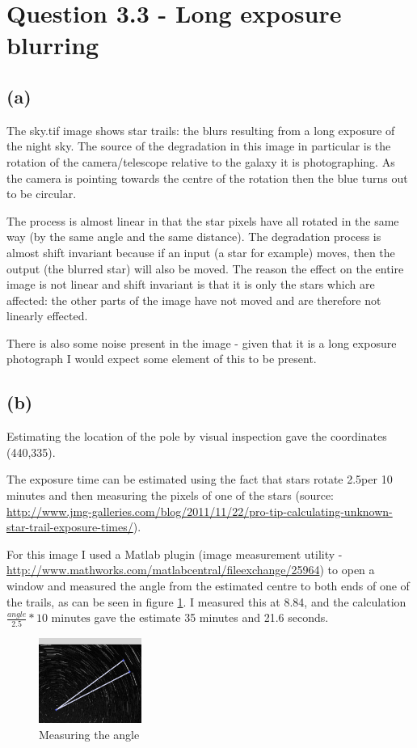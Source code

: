 \documentclass{article}
\begin{document}
\section*{Question 3.3 - Long exposure blurring}
\subsection*{(a)}
The sky.tif image shows star trails: the blurs resulting from a long exposure of the night sky. The source of the degradation in this image in particular is the rotation of the camera/telescope relative to the galaxy it is photographing. As the camera is pointing towards the centre of the rotation then the blue turns out to be circular.

The process is almost linear in that the star pixels have all rotated in the same way (by the same angle and the same distance). The degradation process is almost shift invariant because if an input (a star for example) moves, then the output (the blurred star) will also be moved. The reason the effect on the entire image is not linear and shift invariant is that it is only the stars which are affected: the other parts of the image have not moved and are therefore not linearly effected.

There is also some noise present in the image - given that it is a long exposure photograph I would expect some element of this to be present.

\subsection*{(b)}
Estimating the location of the pole by visual inspection gave the coordinates (440,335).

The exposure time can be estimated using the fact that stars rotate 2.5\textdegree per 10 minutes and then measuring the pixels of one of the stars (source: \url{http://www.jmg-galleries.com/blog/2011/11/22/pro-tip-calculating-unknown-star-trail-exposure-times/}).

For this image I used a Matlab plugin (image measurement utility - \url{http://www.mathworks.com/matlabcentral/fileexchange/25964}) to open a window and measured the angle from the estimated centre to both ends of one of the trails, as can be seen in figure \ref{q3:measure}. I measured this at 8.84\textdegree, and the calculation $ \frac {angle} {2.5} * 10 \text{ minutes}$ gave the estimate 35 minutes and 21.6 seconds.
	
	\begin{figure}[h!]
		\includegraphics[width=0.3\textwidth]{q3ss.png}
		\caption{Measuring the angle}
		\label{q3:measure}
	\end{figure}
	
\end{document}
